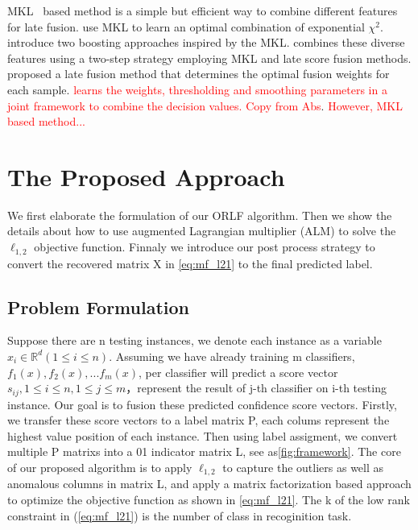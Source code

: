 \documentclass[letterpaper]{article}
\def\dsR{\mathds{R}}
\def\yanred{\textcolor{red}}
\begin{document}
MKL~\cite{Rakotomamonjy2008Simplemkl} based method is a simple but efficient way to combine different features for late fusion. \cite{vedaldi2009multiple} use MKL to learn an optimal combination of exponential ${\chi}^2$. \cite{gehler2009feature} introduce two boosting approaches inspired by the MKL. \cite{natarajan2012multimodal} combines these diverse features using a two-step strategy employing MKL and late score fusion methods. \cite{lai2015learning} proposed a late fusion method that determines the optimal fusion weights for each sample. \yanred{\cite{xuiccv2013feature} learns the weights, thresholding and smoothing parameters in a joint framework to combine the decision values. Copy from Abs}. \yanred{However, MKL based method...}



\section{The Proposed Approach}
We first elaborate the formulation of our ORLF algorithm. Then we show the details about how to use augmented Lagrangian multiplier (ALM) to solve the $\ell_{1,2}$ objective function. Finnaly we introduce our post process strategy to convert the recovered matrix X in \ref{eq:mf_l21} to the final predicted label.


\subsection{Problem Formulation}
Suppose there are n testing instances, we denote each instance as a variable $x_i{\in}\dsR^{d}(1{\leq}i{\leq}n)$. Assuming we have already training m classifiers, $f_1(x), f_2(x), ... f_m(x)$, per classifier will predict a score vector $s_{ij}, 1{\leq}i{\leq}n, 1{\leq}j{\leq}m $，represent the result of j-th classifier on i-th testing instance. Our goal is to fusion these predicted confidence score vectors. Firstly, we transfer these score vectors to a label matrix P, each colums represent the highest value position of each instance. Then using label assigment, we convert multiple P matrixs into a 01 indicator matrix L, see as{\ref{fig:framework}}.
The core of our proposed algorithm is to apply $\ell_{1,2}$ to capture the outliers as well as anomalous columns in matrix L, and apply a matrix factorization based approach to optimize the objective function as shown in \ref{eq:mf_l21}. The k of the low rank constraint in (\ref{eq:mf_l21}) is the number of class in recoginition task.
\end{document}
